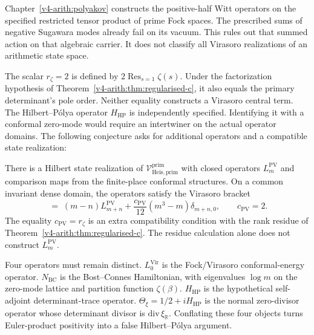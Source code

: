 \begin{remark}
\label{v4-arith:rh:rem:Virasoro-reconciliation}
Chapter~\ref{v4-arith:polyakov} constructs the positive-half Witt
operators on the specified restricted tensor product of prime
Fock spaces. The prescribed sums of negative Sugawara modes already
fail on its vacuum. This rules out that summed action on that
algebraic carrier. It does not classify all Virasoro realizations
of an arithmetic state space.

The scalar \(r_\zeta=2\) is defined by
\(2\operatorname{Res}_{s=1}\zeta(s)\). Under the factorization
hypothesis of Theorem~\ref{v4-arith:thm:regularised-c}, it also equals
the primary determinant's pole order. Neither equality constructs
a Virasoro central term. The Hilbert--P\'olya operator
\(H_{\mathrm{HP}}\) is independently specified. Identifying it with
a conformal zero-mode would require an intertwiner on the actual
operator domains. The following conjecture asks for additional
operators and a compatible state realization:
\end{remark}

\begin{conjecture}
\label{v4-arith:rh:conj:primary-Virasoro}
There is a Hilbert state realization of
\(\mathcal{V}^{\mathrm{prim}}_{\mathrm{Heis},\mathrm{prim}}\) with
closed operators \(L_m^{\mathrm{PV}}\) and comparison maps from the
finite-place conformal structures. On a common invariant dense domain,
the operators satisfy the Virasoro bracket
\begin{equation}
[L_{m}^{\mathrm{PV}},L_{n}^{\mathrm{PV}}]\;=\;(m-n)L_{m+n}^{\mathrm{PV}}+\frac{c_{\mathrm{PV}}}{12}(m^{3}-m)\delta_{m+n,0},\qquad c_{\mathrm{PV}}=2.
\end{equation}
The equality \(c_{\mathrm{PV}}=r_{\zeta}\) is an extra compatibility
condition with the rank residue of
Theorem~\ref{v4-arith:thm:regularised-c}. The residue calculation alone does
not construct \(L_{m}^{\mathrm{PV}}\).
\end{conjecture}

\begin{remark}
\label{v4-arith:rh:rem:spectral-convention}
Four operators must remain distinct. \(L_{0}^{\mathrm{Vir}}\) is the
Fock/Virasoro conformal-energy operator. \(N_{\mathrm{BC}}\) is the
Bost--Connes Hamiltonian, with eigenvalues \(\log m\) on the
zero-mode lattice and partition function \(\zeta(\beta)\).
\(H_{\mathrm{HP}}\) is the hypothetical self-adjoint determinant-trace
operator. \(\Theta_{\xi}=1/2+iH_{\mathrm{HP}}\) is the normal
zero-divisor operator whose determinant divisor is
\(\mathrm{div}\,\xi_{\mathbb R}\). Conflating
these four objects turns Euler-product positivity into a false
Hilbert--P\'olya argument.
\end{remark}

